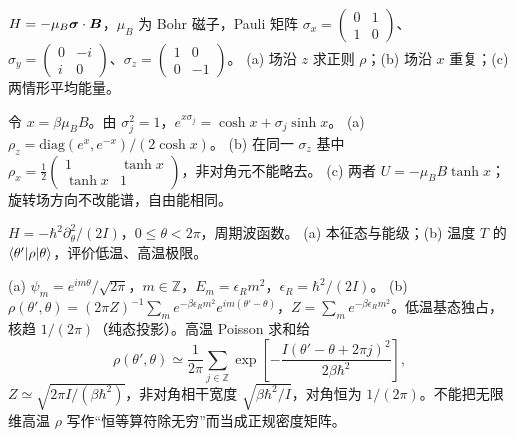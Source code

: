 \begin{center}\end{center}
\begin{exercise}
$H=-\mu_B\boldsymbol{\sigma}\cdot\boldsymbol{B}$，$\mu_B$ 为 Bohr 磁子，Pauli 矩阵 $\sigma_x=\left(\begin{smallmatrix}0&1\\1&0\end{smallmatrix}\right)$、$\sigma_y=\left(\begin{smallmatrix}0&-i\\i&0\end{smallmatrix}\right)$、$\sigma_z=\left(\begin{smallmatrix}1&0\\0&-1\end{smallmatrix}\right)$。
(a) 场沿 $z$ 求正则 $\rho$；(b) 场沿 $x$ 重复；(c) 两情形平均能量。
\end{exercise}
\begin{solution}
令 $x=\beta\mu_BB$。由 $\sigma_j^2=1$，$e^{x\sigma_j}=\cosh x+\sigma_j\sinh x$。
(a) $\rho_z=\mathrm{diag}(e^x,e^{-x})/(2\cosh x)$。
(b) 在同一 $\sigma_z$ 基中 $\rho_x=\tfrac12\left(\begin{smallmatrix}1&\tanh x\\\tanh x&1\end{smallmatrix}\right)$，非对角元不能略去。
(c) 两者 $U=-\mu_BB\tanh x$；旋转场方向不改能谱，自由能相同。
\end{solution}
\begin{exercise}
$H=-\hbar^2\partial_\theta^2/(2I)$，$0\le\theta<2\pi$，周期波函数。
(a) 本征态与能级；(b) 温度 $T$ 的 $\langle \theta'\rvert\rho\lvert \theta\rangle$，评价低温、高温极限。
\end{exercise}
\begin{solution}
(a) $\psi_m=e^{im\theta}/\sqrt{2\pi}$，$m\in\mathbb Z$，$E_m=\epsilon_Rm^2$，$\epsilon_R=\hbar^2/(2I)$。
(b) $\rho(\theta',\theta)=(2\pi Z)^{-1}\sum_m e^{-\beta\epsilon_Rm^2}e^{im(\theta'-\theta)}$，$Z=\sum_m e^{-\beta\epsilon_Rm^2}$。低温基态独占，核趋 $1/(2\pi)$（纯态投影）。高温 Poisson 求和给
\[\rho(\theta',\theta)\simeq\frac1{2\pi}\sum_{j\in\mathbb Z}\exp\left[-\frac{I(\theta'-\theta+2\pi j)^2}{2\beta\hbar^2}\right],\]
$Z\simeq\sqrt{2\pi I/(\beta\hbar^2)}$，非对角相干宽度 $\sqrt{\beta\hbar^2/I}$，对角恒为 $1/(2\pi)$。不能把无限维高温 $\rho$ 写作“恒等算符除无穷”而当成正规密度矩阵。
\end{solution}
